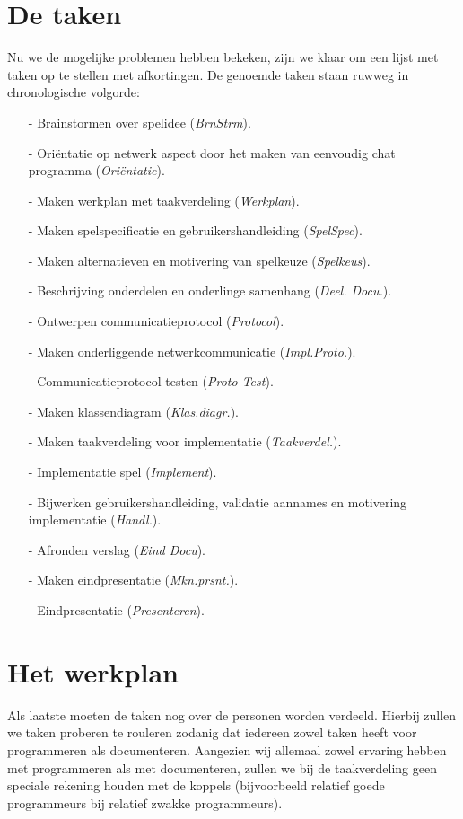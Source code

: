 \documentclass[a4paper,11pt]{article}
\newcommand{\BS}{BrnStrm}
\newcommand{\ON}{Ori\"entatie}
\newcommand{\MW}{Werkplan}
\newcommand{\MS}{SpelSpec}
\newcommand{\MA}{Spelkeus}
\newcommand{\BO}{Deel. Docu.}
\newcommand{\OC}{Protocol}
\newcommand{\MN}{Impl.Proto.}
\newcommand{\CT}{Proto Test}
\newcommand{\MK}{Klas.diagr.}
\newcommand{\MT}{Taakverdel.}
\newcommand{\IS}{Implement}
\newcommand{\BG}{Handl.}
\newcommand{\AV}{Eind Docu}
\newcommand{\ME}{Mkn.prsnt.}
\newcommand{\EP}{Presenteren}
\begin{document}
    \section{De taken}
    Nu we de mogelijke problemen hebben bekeken, zijn we klaar om een lijst met taken op te stellen met afkortingen. De genoemde taken staan ruwweg in chronologische volgorde:
    \begin{enumerate}
    \item[-] Brainstormen over spelidee (\emph{\BS}).
    \item[-] Ori\"entatie op netwerk aspect door het maken van eenvoudig chat programma (\emph{\ON}).
    \item[-] Maken werkplan met taakverdeling (\emph{\MW}).
    \item[-] Maken spelspecificatie en gebruikershandleiding (\emph{\MS}).
    \item[-] Maken alternatieven en motivering van spelkeuze (\emph{\MA}).
    \item[-] Beschrijving onderdelen en onderlinge samenhang (\emph{\BO}).
    \item[-] Ontwerpen communicatieprotocol (\emph{\OC}).
    \item[-] Maken onderliggende netwerkcommunicatie (\emph{\MN}).
    \item[-] Communicatieprotocol testen (\emph{\CT}).
    \item[-] Maken klassendiagram (\emph{\MK}).
    \item[-] Maken taakverdeling voor implementatie (\emph{\MT}).
    \item[-] Implementatie spel (\emph{\IS}).
    \item[-] Bijwerken gebruikershandleiding, validatie aannames en motivering implementatie (\emph{\BG}).
    \item[-] Afronden verslag (\emph{\AV}).
    \item[-] Maken eindpresentatie (\emph{\ME}).
    \item[-] Eindpresentatie (\emph{\EP}).
    \end{enumerate}
    
    \section{Het werkplan}
    Als laatste moeten de taken nog over de personen worden verdeeld. Hierbij zullen we taken proberen te rouleren zodanig dat iedereen zowel taken heeft voor programmeren als documenteren. Aangezien wij allemaal zowel ervaring hebben met programmeren als met documenteren, zullen we bij de taakverdeling geen speciale rekening houden met de koppels (bijvoorbeeld relatief goede programmeurs bij relatief zwakke programmeurs). 
    
\end{document}
